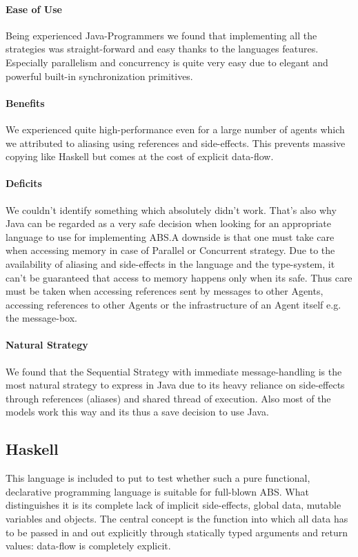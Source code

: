 \paragraph{Ease of Use}
Being experienced Java-Programmers we found that implementing all the strategies was straight-forward and easy thanks to the languages features. Especially parallelism and concurrency is quite very easy due to elegant and powerful built-in synchronization primitives.

\paragraph{Benefits}
We experienced quite high-performance even for a large number of agents which we attributed to aliasing using references and side-effects. This prevents massive copying like Haskell but comes at the cost of explicit data-flow.

\paragraph{Deficits}
We couldn't identify something which absolutely didn't work. That's also why Java can be regarded as a very safe decision when looking for an appropriate language to use for implementing ABS.A downside is that one must take care when accessing memory in case of Parallel or Concurrent strategy. Due to the availability of aliasing and side-effects in the language and the type-system, it can't be guaranteed that access to memory happens only when its safe. Thus care must be taken when accessing references sent by messages to other Agents, accessing references to other Agents or the infrastructure of an Agent itself e.g. the message-box.

\paragraph{Natural Strategy}
We found that the Sequential Strategy with immediate message-handling is the most natural strategy to express in Java due to its heavy reliance on side-effects through references (aliases) and shared thread of execution. Also most of the models work this way and its thus a save decision to use Java.





 
\subsection{Haskell}
This language is included to put to test whether such a pure functional, declarative programming language is suitable for full-blown ABS. What distinguishes it is its complete lack of implicit side-effects, global data, mutable variables and objects. The central concept is the function into which all data has to be passed in and out explicitly through statically typed arguments and return values: data-flow is completely explicit.

